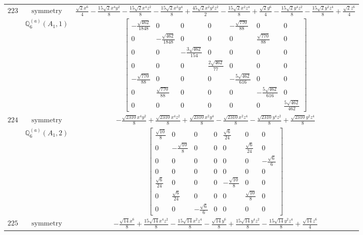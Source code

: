 \documentclass[fleqn,8pt,landscape]{jsarticle}
\begin{document}
\begin{longtable}{ccc}
$ 223 $ & $ \text{symmetry} $ & $ \frac{\sqrt{2} x^{6}}{4} - \frac{15 \sqrt{2} x^{4} y^{2}}{8} - \frac{15 \sqrt{2} x^{4} z^{2}}{8} - \frac{15 \sqrt{2} x^{2} y^{4}}{8} + \frac{45 \sqrt{2} x^{2} y^{2} z^{2}}{2} - \frac{15 \sqrt{2} x^{2} z^{4}}{8} + \frac{\sqrt{2} y^{6}}{4} - \frac{15 \sqrt{2} y^{4} z^{2}}{8} - \frac{15 \sqrt{2} y^{2} z^{4}}{8} + \frac{\sqrt{2} z^{6}}{4} $ \\
$  $ & $ \mathbb{Q}_{6}^{(a)}(A_{1},1) $ & $ \begin{bmatrix} - \frac{\sqrt{462}}{1848} & 0 & 0 & 0 & - \frac{\sqrt{770}}{88} & 0 & 0 \\ 0 & - \frac{\sqrt{462}}{1848} & 0 & 0 & 0 & \frac{\sqrt{770}}{88} & 0 \\ 0 & 0 & - \frac{3 \sqrt{462}}{154} & 0 & 0 & 0 & 0 \\ 0 & 0 & 0 & \frac{2 \sqrt{462}}{77} & 0 & 0 & 0 \\ - \frac{\sqrt{770}}{88} & 0 & 0 & 0 & - \frac{5 \sqrt{462}}{616} & 0 & 0 \\ 0 & \frac{\sqrt{770}}{88} & 0 & 0 & 0 & - \frac{5 \sqrt{462}}{616} & 0 \\ 0 & 0 & 0 & 0 & 0 & 0 & \frac{5 \sqrt{462}}{462} \end{bmatrix} $ \\ \hline
$ 224 $ & $ \text{symmetry} $ & $ - \frac{\sqrt{2310} x^{4} y^{2}}{8} + \frac{\sqrt{2310} x^{4} z^{2}}{8} + \frac{\sqrt{2310} x^{2} y^{4}}{8} - \frac{\sqrt{2310} x^{2} z^{4}}{8} - \frac{\sqrt{2310} y^{4} z^{2}}{8} + \frac{\sqrt{2310} y^{2} z^{4}}{8} $ \\
$  $ & $ \mathbb{Q}_{6}^{(a)}(A_{1},2) $ & $ \begin{bmatrix} \frac{\sqrt{10}}{8} & 0 & 0 & 0 & \frac{\sqrt{6}}{24} & 0 & 0 \\ 0 & - \frac{\sqrt{10}}{8} & 0 & 0 & 0 & \frac{\sqrt{6}}{24} & 0 \\ 0 & 0 & 0 & 0 & 0 & 0 & - \frac{\sqrt{6}}{6} \\ 0 & 0 & 0 & 0 & 0 & 0 & 0 \\ \frac{\sqrt{6}}{24} & 0 & 0 & 0 & - \frac{\sqrt{10}}{8} & 0 & 0 \\ 0 & \frac{\sqrt{6}}{24} & 0 & 0 & 0 & \frac{\sqrt{10}}{8} & 0 \\ 0 & 0 & - \frac{\sqrt{6}}{6} & 0 & 0 & 0 & 0 \end{bmatrix} $ \\ \hline
$ 225 $ & $ \text{symmetry} $ & $ - \frac{\sqrt{14} x^{6}}{8} + \frac{15 \sqrt{14} x^{4} z^{2}}{8} - \frac{15 \sqrt{14} x^{2} z^{4}}{8} - \frac{\sqrt{14} y^{6}}{8} + \frac{15 \sqrt{14} y^{4} z^{2}}{8} - \frac{15 \sqrt{14} y^{2} z^{4}}{8} + \frac{\sqrt{14} z^{6}}{4} $ \\

\end{longtable}
\end{document}

